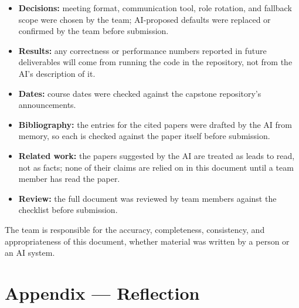 \documentclass{article}
\begin{document}
\begin{itemize}
  \item \textbf{Decisions:} meeting format, communication tool, role
  rotation, and fallback scope were chosen by the team; AI-proposed
  defaults were replaced or confirmed by the team before submission.
  \item \textbf{Results:} any correctness or performance numbers reported
  in future deliverables will come from running the code in the
  repository, not from the AI's description of it.
  \item \textbf{Dates:} course dates were checked against the capstone
  repository's announcements.
  \item \textbf{Bibliography:} the entries for the cited papers were
  drafted by the AI from memory, so each is checked against the paper
  itself before submission.
  \item \textbf{Related work:} the papers suggested by the AI are treated
  as leads to read, not as facts; none of their claims are relied on in
  this document until a team member has read the paper.
  \item \textbf{Review:} the full document was reviewed by team members
  against the checklist before submission.
\end{itemize}

The team is responsible for the accuracy, completeness, consistency, and
appropriateness of this document, whether material was written by a person
or an AI system.

\newpage{}

\section*{Appendix --- Reflection}


\end{document}
